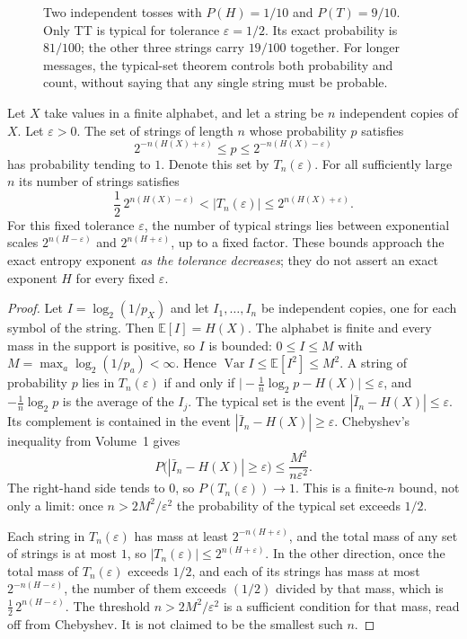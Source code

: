 \begin{figure}[ht]
\centering
{}
\caption{Two independent tosses with $P(H)=1/10$ and $P(T)=9/10$. Only TT is typical for tolerance $\varepsilon=1/2$. Its exact probability is $81/100$; the other three strings carry $19/100$ together. For longer messages, the typical-set theorem controls both probability and count, without saying that any single string must be probable.}
\label{fig:typicalcoin}
\end{figure}

\begin{theorem}\label{thm:aep}
Let $X$ take values in a finite alphabet, and let a string be $n$ independent copies of $X$. Let $\varepsilon>0$. The set of strings of length $n$ whose probability $p$ satisfies
\[
 2^{-n(H(X)+\varepsilon)}\le p\le 2^{-n(H(X)-\varepsilon)}
\]
has probability tending to $1$. Denote this set by $T_n(\varepsilon)$. For all sufficiently large $n$ its number of strings satisfies
\[
 \frac12\,2^{n(H(X)-\varepsilon)}<|T_n(\varepsilon)|\le2^{n(H(X)+\varepsilon)}.
\]
For this fixed tolerance $\varepsilon$, the number of typical strings lies between exponential scales $2^{n(H-\varepsilon)}$ and $2^{n(H+\varepsilon)}$, up to a fixed factor. These bounds approach the exact entropy exponent \emph{as the tolerance decreases}; they do not assert an exact exponent $H$ for every fixed $\varepsilon$.
\end{theorem}
\begin{proof}
Let $I=\log_2(1/p_X)$ and let $I_1,\ldots,I_n$ be independent copies, one for each symbol of the string. Then $\mathbb E[I]=H(X)$. The alphabet is finite and every mass in the support is positive, so $I$ is bounded: $0\le I\le M$ with $M=\max_a\log_2(1/p_a)<\infty$. Hence $\operatorname{Var} I\le\mathbb E[I^2]\le M^2$. A string of probability $p$ lies in $T_n(\varepsilon)$ if and only if $\bigl|-\frac1n\log_2 p-H(X)\bigr|\le\varepsilon$, and $-\frac1n\log_2 p$ is the average of the $I_j$. The typical set is the event $|\bar I_n-H(X)|\le\varepsilon$. Its complement is contained in the event $|\bar I_n-H(X)|\ge\varepsilon$. Chebyshev's inequality from Volume~1 gives
\[
 P\bigl(|\bar I_n-H(X)|\ge\varepsilon\bigr)\le\frac{M^2}{n\varepsilon^2}.
\]
The right-hand side tends to $0$, so $P(T_n(\varepsilon))\to1$. This is a finite-$n$ bound, not only a limit: once $n>2M^2/\varepsilon^2$ the probability of the typical set exceeds $1/2$.

Each string in $T_n(\varepsilon)$ has mass at least $2^{-n(H+\varepsilon)}$, and the total mass of any set of strings is at most $1$, so $|T_n(\varepsilon)|\le 2^{n(H+\varepsilon)}$. In the other direction, once the total mass of $T_n(\varepsilon)$ exceeds $1/2$, and each of its strings has mass at most $2^{-n(H-\varepsilon)}$, the number of them exceeds $(1/2)$ divided by that mass, which is $\tfrac12\,2^{n(H-\varepsilon)}$. The threshold $n>2M^2/\varepsilon^2$ is a sufficient condition for that mass, read off from Chebyshev. It is not claimed to be the smallest such $n$.
\end{proof}

